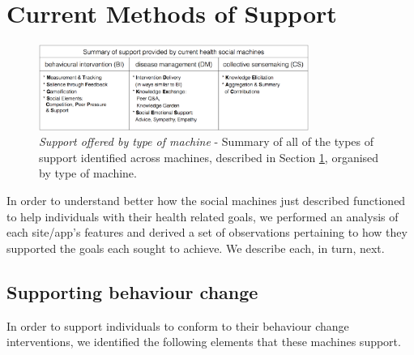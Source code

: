 \documentclass{sig-alternate}
\begin{document}
\section{Current Methods of Support}
\label{sec:support}
\begin{figure}[tb]
\begin{center}
\includegraphics[width=8.8cm]{img/table2-summary.png}
\caption{\emph{Support offered by type of machine} - Summary of all of
  the types of support identified across machines, described in
  Section \ref{sec:support}, organised by type of machine.} \label{fig:summaryofsupport}
\end{center}
\end{figure}


In order to understand better how the social machines just described
functioned to help individuals with their health related goals, we
performed an analysis of each site/app's features and derived a set of
observations pertaining to how they supported the goals each sought to
achieve.  We describe each, in turn, next.

\subsection{Supporting behaviour change}
\label{sec:intervention}

In order to support individuals to conform to their behaviour change
interventions, we identified the following elements that these machines
support.
\end{document}
